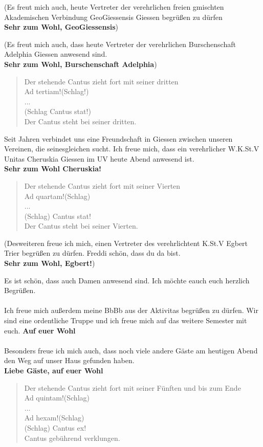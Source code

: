 (Es freut mich auch, heute Vertreter der verehrlichen
freien gmischten Akademischen Verbindung GeoGiessensis Giessen begrüßen zu 
dürfen \\
\textbf{Sehr zum Wohl, GeoGiessensis})

(Es freut mich auch, dass heute Vertreter der verehrlichen
Burschenschaft Adelphia Giessen anwesend sind.\\
\textbf{Sehr zum Wohl, Burschenschaft Adelphia})\\
\begin{quote}
    Der stehende Cantus zieht fort mit seiner dritten\\
    Ad tertiam!(Schlag!)\\
    ...\\
    (Schlag Cantus stat!) \\
    Der Cantus steht bei seiner dritten.\\
\end{quote}
Seit Jahren verbindet uns eine Freundschaft in Giessen zwischen unseren Vereinen,
die seinesgleichen sucht. Ich freue mich, dass ein verehrlicher W.K.St.V Unitas
Cheruskia Giessen im UV heute Abend anwesend ist.\\
\textbf{Sehr zum Wohl Cheruskia!}
\begin{quote}
    Der stehende Cantus zieht fort mit seiner Vierten\\
    Ad quartam!(Schlag)\\
    ...\\
    (Schlag) Cantus stat!\\
    Der Cantus steht bei seiner Vierten.
\end{quote}
(Desweiteren freue ich mich, einen Vertreter des verehrlichtent
K.St.V Egbert Trier begrüßen zu dürfen. Freddi schön, dass du da bist.\\
\textbf{Sehr zum Wohl, Egbert!})

Es ist schön, dass auch Damen anwesend sind. Ich möchte eauch euch herzlich Begrüßen.\\
\\
Ich freue mich außerdem meine BbBb aus der Aktivitas begrüßen zu dürfen. Wir sind eine
ordentliche Truppe und ich freue mich auf das weitere Semester mit euch.
\textbf{Auf euer Wohl}\\ \\
Besonders freue ich mich auch, dass noch viele andere Gäste am heutigen Abend 
den Weg auf unser Haus gefunden haben.\\
\textbf{Liebe Gäste, auf euer Wohl}\\
\begin{quote}
    Der stehende Cantus zieht fort mit seiner Fünften und bis zum Ende\\
    Ad quintam!(Schlag)\\
    ...\\
    Ad hexam!(Schlag)\\
    (Schlag) Cantus ex!\\
    Cantus gebührend verklungen.
\end{quote}
